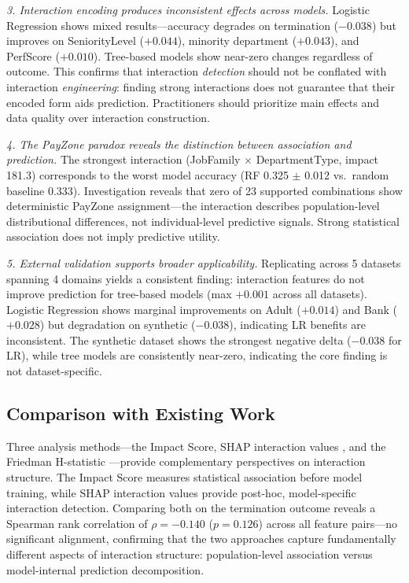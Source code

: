 \documentclass[conference]{IEEEtran}
\begin{document}
\textit{3. Interaction encoding produces inconsistent effects across models.} Logistic Regression shows mixed results---accuracy degrades on termination ($-0.038$) but improves on SeniorityLevel ($+0.044$), minority department ($+0.043$), and PerfScore ($+0.010$). Tree-based models show near-zero changes regardless of outcome. This confirms that interaction \textit{detection} should not be conflated with interaction \textit{engineering}: finding strong interactions does not guarantee that their encoded form aids prediction. Practitioners should prioritize main effects and data quality over interaction construction.

\textit{4. The PayZone paradox reveals the distinction between association and prediction.} The strongest interaction (JobFamily $\times$ DepartmentType, impact 181.3) corresponds to the worst model accuracy (RF 0.325 $\pm$ 0.012 vs.\ random baseline 0.333). Investigation reveals that zero of 23 supported combinations show deterministic PayZone assignment---the interaction describes population-level distributional differences, not individual-level predictive signals. Strong statistical association does not imply predictive utility.

\textit{5. External validation supports broader applicability.} Replicating across 5 datasets spanning 4 domains yields a consistent finding: interaction features do not improve prediction for tree-based models (max $+0.001$ across all datasets). Logistic Regression shows marginal improvements on Adult ($+0.014$) and Bank ($+0.028$) but degradation on synthetic ($-0.038$), indicating LR benefits are inconsistent. The synthetic dataset shows the strongest negative delta ($-0.038$ for LR), while tree models are consistently near-zero, indicating the core finding is not dataset-specific.

\subsection{Comparison with Existing Work}

Three analysis methods---the Impact Score, SHAP interaction values \cite{lundberg2020shap}, and the Friedman H-statistic \cite{friedman2008predictive}---provide complementary perspectives on interaction structure. The Impact Score measures statistical association before model training, while SHAP interaction values provide post-hoc, model-specific interaction detection. Comparing both on the termination outcome reveals a Spearman rank correlation of $\rho = -0.140$ ($p = 0.126$) across all feature pairs---no significant alignment, confirming that the two approaches capture fundamentally different aspects of interaction structure: population-level association versus model-internal prediction decomposition.
\end{document}
